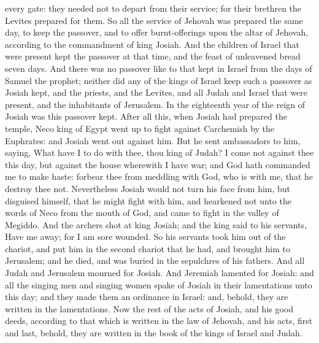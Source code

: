 every gate: they needed not to depart from their service; for their brethren the Levites prepared for them.  So all the service of Jehovah was prepared the same day, to keep the passover, and to offer burnt-offerings upon the altar of Jehovah, according to the commandment of king Josiah. And the children of Israel that were present kept the passover at that time, and the feast of unleavened bread seven days. And there was no passover like to that kept in Israel from the days of Samuel the prophet; neither did any of the kings of Israel keep such a passover as Josiah kept, and the priests, and the Levites, and all Judah and Israel that were present, and the inhabitants of Jerusalem. In the eighteenth year of the reign of Josiah was this passover kept.  After all this, when Josiah had prepared the temple, Neco king of Egypt went up to fight against Carchemish by the Euphrates: and Josiah went out against him. But he sent ambassadors to him, saying, What have I to do with thee, thou king of Judah? I come not against thee this day, but against the house wherewith I have war; and God hath commanded me to make haste: forbear thee from meddling with God, who is with me, that he destroy thee not. Nevertheless Josiah would not turn his face from him, but disguised himself, that he might fight with him, and hearkened not unto the words of Neco from the mouth of God, and came to fight in the valley of Megiddo. And the archers shot at king Josiah; and the king said to his servants, Have me away; for I am sore wounded. So his servants took him out of the chariot, and put him in the second chariot that he had, and brought him to Jerusalem; and he died, and was buried in the sepulchres of his fathers. And all Judah and Jerusalem mourned for Josiah. And Jeremiah lamented for Josiah: and all the singing men and singing women spake of Josiah in their lamentations unto this day; and they made them an ordinance in Israel: and, behold, they are written in the lamentations. Now the rest of the acts of Josiah, and his good deeds, according to that which is written in the law of Jehovah, and his acts, first and last, behold, they are written in the book of the kings of Israel and Judah. 

